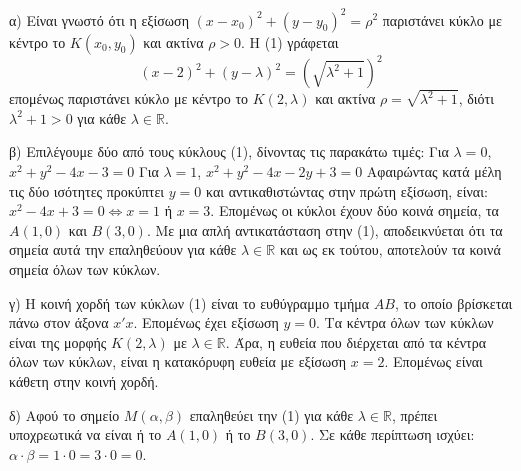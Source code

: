 α) Είναι γνωστό ότι η εξίσωση $(x-x_0)^2+(y-y_0)^2=\rho^2$ παριστάνει κύκλο με κέντρο το $K(x_0,y_0)$ και ακτίνα $\rho > 0$.
Η (1) γράφεται
\[ (x-2)^2+(y-\lambda)^2=\left(\sqrt{\lambda^2+1}\right)^2 \]
επομένως παριστάνει κύκλο με κέντρο το $K(2,\lambda)$ και ακτίνα $\rho = \sqrt{\lambda^2+1}$, διότι $\lambda^2+1 > 0$ για κάθε $\lambda \in \mathbb{R}$.

β) Επιλέγουμε δύο από τους κύκλους (1), δίνοντας τις παρακάτω τιμές:
Για $\lambda=0$, $x^2+y^2-4x-3=0$
Για $\lambda=1$, $x^2+y^2-4x-2y+3=0$
Αφαιρώντας κατά μέλη τις δύο ισότητες προκύπτει $y=0$ και αντικαθιστώντας στην πρώτη εξίσωση, είναι: $x^2-4x+3=0 \Leftrightarrow x=1$ ή $x=3$.
Επομένως οι κύκλοι έχουν δύο κοινά σημεία, τα $A(1,0)$ και $B(3,0)$.
Με μια απλή αντικατάσταση στην (1), αποδεικνύεται ότι τα σημεία αυτά την επαληθεύουν για κάθε $\lambda \in \mathbb{R}$ και ως εκ τούτου, αποτελούν τα κοινά σημεία όλων των κύκλων.

γ) Η κοινή χορδή των κύκλων (1) είναι το ευθύγραμμο τμήμα $AB$, το οποίο βρίσκεται πάνω στον άξονα $x'x$. Επομένως έχει εξίσωση $y=0$.
Τα κέντρα όλων των κύκλων είναι της μορφής $K(2,\lambda)$ με $\lambda \in \mathbb{R}$. Άρα, η ευθεία που διέρχεται από τα κέντρα όλων των κύκλων, είναι η κατακόρυφη ευθεία με εξίσωση $x=2$.
Επομένως είναι κάθετη στην κοινή χορδή.


δ) Αφού το σημείο $M(\alpha, \beta)$ επαληθεύει την (1) για κάθε $\lambda \in \mathbb{R}$, πρέπει υποχρεωτικά να είναι ή το $A(1,0)$ ή το $B(3,0)$. Σε κάθε περίπτωση ισχύει: $\alpha \cdot \beta = 1 \cdot 0 = 3 \cdot 0 = 0$.
\endlysh